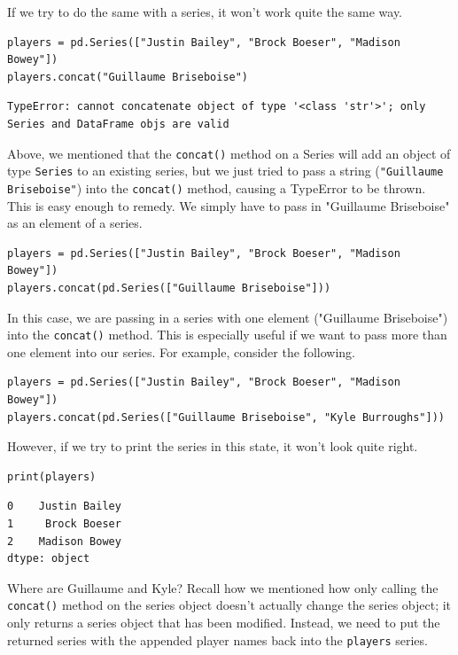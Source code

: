 If we try to do the same with a  series, it won't work quite the same way.
\begin{lstlisting}[style=pippython]
players = pd.Series(["Justin Bailey", "Brock Boeser", "Madison Bowey"])
players.concat("Guillaume Briseboise")
\end{lstlisting}
\begin{lstlisting}[style=none]
TypeError: cannot concatenate object of type '<class 'str'>'; only Series and DataFrame objs are valid
\end{lstlisting}
Above, we mentioned that the \verb|concat()| method on a Series will add an object of type \verb|Series| to an existing series, but we just tried to pass a string (\verb|"Guillaume Briseboise"|) into the \verb|concat()| method, causing a TypeError to be thrown. This is easy enough to remedy. We simply have to pass in "Guillaume Briseboise" as an element of a  series.
\begin{lstlisting}[style=pippython]
players = pd.Series(["Justin Bailey", "Brock Boeser", "Madison Bowey"])
players.concat(pd.Series(["Guillaume Briseboise"]))
\end{lstlisting}
In this case, we are passing in a  series with one element ("Guillaume Briseboise") into the \verb|concat()| method. This is especially useful if we want to pass more than one element into our series. For example, consider the following.
\begin{lstlisting}[style=pippython]
players = pd.Series(["Justin Bailey", "Brock Boeser", "Madison Bowey"])
players.concat(pd.Series(["Guillaume Briseboise", "Kyle Burroughs"]))
\end{lstlisting}
However, if we try to print the series in this state, it won't look quite right.
\begin{lstlisting}[style=pippython]
print(players)
\end{lstlisting}
\begin{lstlisting}[style=none]
0    Justin Bailey
1     Brock Boeser
2    Madison Bowey
dtype: object
\end{lstlisting}
Where are Guillaume and Kyle? Recall how we mentioned how only calling the \verb|concat()| method on the series object doesn't actually change the series object; it only returns a series object that has been modified. Instead, we need to put the returned series with the appended player names back into the \verb|players| series.
